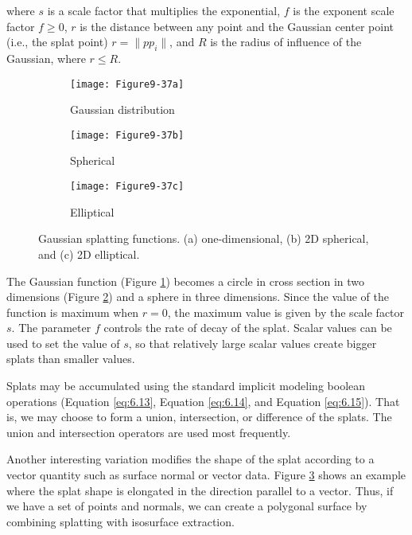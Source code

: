 \noindent where $s$ is a scale factor that multiplies the exponential, $f$ is the exponent scale factor $f \geq 0$, $r$ is the distance between any point and the Gaussian center point (i.e., the splat point) $r = \| p p_i \|$, and $R$ is the radius of influence of the Gaussian, where $r \leq R$.

\begin{figure}[htb]
    \centering
	\begin{subfigure}[h]{0.32\linewidth}
		\texttt{[image: Figure9-37a]}
		\captionsetup{justification=centering}
		\caption{Gaussian distribution}
		\label{fig:Figure9-37a}
	\end{subfigure}
	\hfill
	\begin{subfigure}[h]{0.32\linewidth}
		\texttt{[image: Figure9-37b]}
		\captionsetup{justification=centering}
		\caption{Spherical}
		\label{fig:Figure9-37b}
	\end{subfigure}
	\hfill
	\begin{subfigure}[h]{0.32\linewidth}
		\texttt{[image: Figure9-37c]}
		\captionsetup{justification=centering}
		\caption{Elliptical}
		\label{fig:Figure9-37c}
	\end{subfigure}
	\caption{Gaussian splatting functions. (a) one-dimensional, (b) 2D spherical, and (c) 2D elliptical.}\label{fig:Figure9-37}
\end{figure}

The Gaussian function (Figure \ref{fig:Figure9-37a}) becomes a circle in cross section in two dimensions (Figure \ref{fig:Figure9-37b}) and a sphere in three dimensions. Since the value of the function is maximum when $r = 0$, the maximum value is given by the scale factor $s$. The parameter $f$ controls the rate of decay of the splat. Scalar values can be used to set the value of $s$, so that relatively large scalar values create bigger splats than smaller values.

Splats may be accumulated using the standard implicit modeling boolean operations (Equation \ref{eq:6.13}, Equation \ref{eq:6.14}, and Equation \ref{eq:6.15}). That is, we may choose to form a union, intersection, or difference of the splats. The union and intersection operators are used most frequently.

Another interesting variation modifies the shape of the splat according to a vector quantity such as surface normal or vector data. Figure \ref{fig:Figure9-37c} shows an example where the splat shape is elongated in the direction parallel to a vector. Thus, if we have a set of points and normals, we can create a polygonal surface by combining splatting with isosurface extraction.

